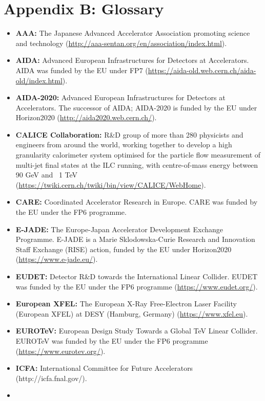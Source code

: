 \documentclass[%
 reprint,
 floatfix,
 amsmath,amssymb,
 aps,
]{revtex4-1}
\begin{document}
\section*{\label{Appendix4} \Large{Appendix B: Glossary} }
\begin{itemize}
\item
\textbf{AAA:} The Japanese Advanced Accelerator Association promoting science and technology (\url{http://aaa-sentan.org/en/association/index.html}).
\item
\textbf{AIDA:} Advanced European Infrastructures for Detectors at Accelerators. AIDA was funded by the EU under FP7 (\url{https://aida-old.web.cern.ch/aida-old/index.html}).
\item
\textbf{AIDA-2020:} Advanced European Infrastructures for Detectors at Accelerators. The successor of AIDA; AIDA-2020 is funded by the EU under Horizon2020 (\url{http://aida2020.web.cern.ch/}).
\item
\textbf{CALICE Collaboration:} R\&D group of more than 280 physicists and engineers from around the world, working together to develop a high granularity calorimeter system optimised for the particle flow measurement of multi-jet final states at the ILC running, with centre-of-mass energy between 90 GeV and ~1 TeV (\url{https://twiki.cern.ch/twiki/bin/view/CALICE/WebHome}).
\item
\textbf{CARE:} Coordinated Accelerator Research in Europe. CARE was funded by the EU under the FP6 programme.
\item
\textbf{E-JADE:} The Europe-Japan Accelerator Development Exchange Programme. E-JADE is a Marie Sklodowska-Curie Research and Innovation Staff Exchange (RISE) action, funded by the EU under Horizon2020 (\url{https://www.e-jade.eu/}).
\item
\textbf{EUDET:} Detector R\&D towards the International Linear Collider. EUDET was funded by the EU under the FP6 programme (\url{https://www.eudet.org/}).
\item
\textbf{European XFEL:} The European X-Ray Free-Electron Laser Facility (European XFEL) at DESY (Hamburg, Germany) (\url{https://www.xfel.eu}).
\item
\textbf{EUROTeV:} European Design Study Towards a Global TeV Linear Collider. EUROTeV was funded by the EU under the FP6 programme (\url{https://www.eurotev.org/}).
\item
\textbf{ICFA:} International Committee for Future Accelerators (http://icfa.fnal.gov/).
\item

\end{itemize}
\end{document}
